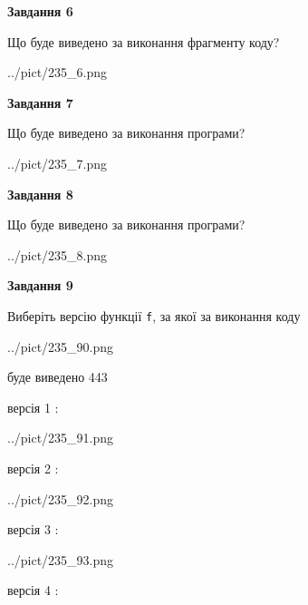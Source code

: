 \documentclass[12pt, ukrainian]{article}
\def\code#1{\Verb!#1!}
\begin{document}
{\begin {large}
{\begin {center}\textbf{Завдання 6}\end {center}}

Що буде виведено за виконання фрагменту коду?\par
\begin{center}
	{../pict/235_6.png}
\end{center}
\newpage

{\begin {center}\textbf{Завдання 7}\end {center}}

Що буде виведено за виконання програми?\par
\begin{center}
	{../pict/235_7.png}
\end{center}
\newpage

{\begin {center}\textbf{Завдання 8}\end {center}}

Що буде виведено за виконання програми?\par
\begin{center}
	{../pict/235_8.png}
\end{center}
\newpage

{\begin {center}\textbf{Завдання 9}\end {center}}

Виберіть версію функції \code{f}, за якої за виконання коду
\begin{center}
	{../pict/235_90.png}
\end{center}
буде виведено 443

\vspace{5mm}
версія 1 :

\begin{center}
	{../pict/235_91.png}
\end{center}
версія 2 :

\begin{center}
	{../pict/235_92.png}
\end{center}
версія 3 :

\begin{center}
	{../pict/235_93.png}
\end{center}
версія 4 :


\end{large}}
\end{document}
